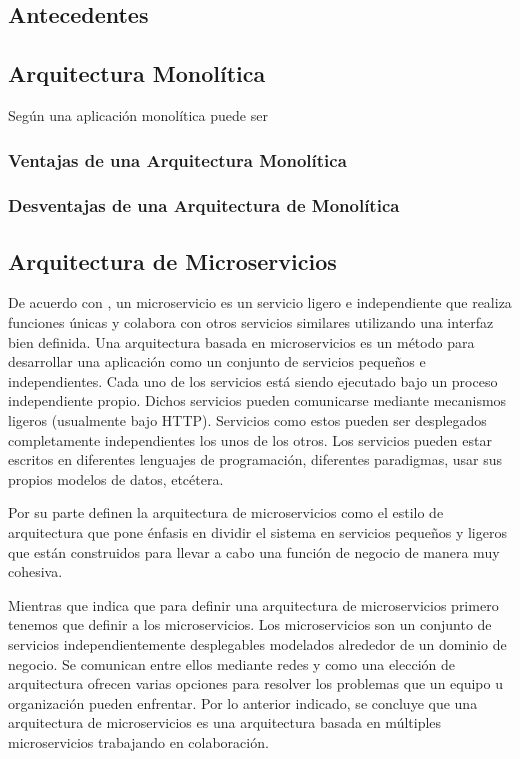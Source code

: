 
\subsection{Antecedentes}

\subsection{Arquitectura Monolítica}

Según \cite{dmitry2014micro} una aplicación monolítica puede ser

\subsubsection{Ventajas de una Arquitectura Monolítica}

\subsubsection{Desventajas de una Arquitectura de Monolítica}

\subsection{Arquitectura de Microservicios}

De acuerdo con \cite{dmitry2014micro}, un microservicio es un servicio ligero e independiente que
realiza funciones únicas y colabora con otros servicios similares utilizando una interfaz bien definida.
Una arquitectura basada en microservicios es un método para desarrollar una aplicación como un conjunto
de servicios pequeños e independientes. Cada uno de los servicios está siendo ejecutado bajo un
proceso independiente propio. Dichos servicios pueden comunicarse mediante mecanismos ligeros (usualmente
bajo HTTP). Servicios como estos pueden ser desplegados completamente independientes los unos de los otros.
Los servicios pueden estar escritos en diferentes lenguajes de programación, diferentes paradigmas,
usar sus propios modelos de datos, etcétera.

Por su parte \cite{alshuqayran2016systematic} definen la arquitectura de microservicios como el estilo de arquitectura
que pone énfasis en dividir el sistema en servicios pequeños y ligeros que están construidos para
llevar a cabo una función de negocio de manera muy cohesiva.

Mientras que \cite{newman2019monolith} indica que para definir una arquitectura de microservicios primero tenemos que
definir a los microservicios. Los microservicios son un conjunto de servicios independientemente
desplegables modelados alrededor de un dominio de negocio. Se comunican entre ellos mediante redes
y como una elección de arquitectura ofrecen varias opciones para resolver los problemas que un
equipo u organización pueden enfrentar. Por lo anterior indicado, se concluye que una arquitectura
de microservicios es una arquitectura basada en múltiples microservicios trabajando en colaboración.

